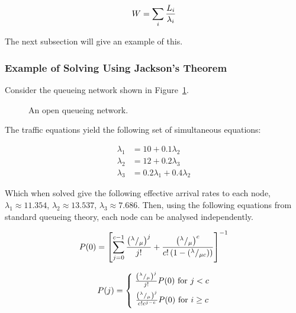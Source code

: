 \documentclass{article}
\begin{document}
\begin{equation}
    W = \sum_i {L_i \over \lambda_i}
\end{equation}

The next subsection will give an example of this.

\subsubsection{Example of Solving Using Jackson's Theorem}

Consider the queueing network shown in Figure~\ref{fig:jacksonnet}.

\begin{figure}[H]
    
    \caption{An open queueing network.}
    \label{fig:jacksonnet}
\end{figure}

The traffic equations yield the following set of simultaneous equations:

\begin{align*}
\lambda_1 &= 10 + 0.1 \lambda_2\\
\lambda_2 &= 12 + 0.2 \lambda_3\\
\lambda_3 &= 0.2 \lambda_1 + 0.4 \lambda_2
\end{align*}

Which when solved give the following effective arrival rates to each node, $\lambda_1 \approx 11.354$, $\lambda_2 \approx 13.537$, $\lambda_3 \approx 7.686$.
Then, using the following equations from standard queueing theory, each node can be analysed independently.

\begin{equation}
P(0) = \left[\sum_{j=0}^{c-1}{\left({^\lambda / _\mu}\right)^j\over j!}+{\left({^\lambda / _\mu}\right)^c\over c!\left(1-{\left(^\lambda / _{\mu c}\right)} \right)}\right]^{-1}
\end{equation}

\begin{equation}
P(j)=\left\{\;\begin{array}{@{}c@{}}
{\left({^\lambda / _\mu}\right)^j\over j!}P(0)\text{ for }j<c\\[2mm]
{\left({^\lambda / _\mu}\right)^j\over c!c^{j-c}}P(0)\text{ for }i\geq c\\[2mm]
\end{array}
\right.
\end{equation}
\end{document}
